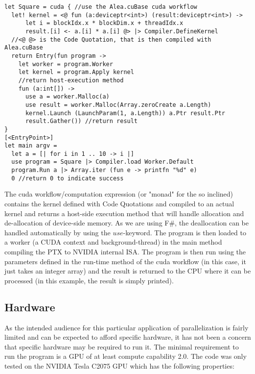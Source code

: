 {\begin{lstlisting}[caption=Alea.cuBase square kernel, label=cubase_add]
let Square = cuda { //use the Alea.cuBase cuda workflow
  let! kernel = <@ fun (a:deviceptr<int>) (result:deviceptr<int>) ->
      let i = blockIdx.x * blockDim.x + threadIdx.x
      result.[i] <- a.[i] * a.[i] @> |> Compiler.DefineKernel
  //<@ @> is the Code Quotation, that is then compiled with Alea.cuBase
  return Entry(fun program ->
    let worker = program.Worker
    let kernel = program.Apply kernel
    //return host-execution method
    fun (a:int[]) ->
      use a = worker.Malloc(a)
      use result = worker.Malloc(Array.zeroCreate a.Length)
      kernel.Launch (LaunchParam(1, a.Length)) a.Ptr result.Ptr
      result.Gather()) //return result
}
[<EntryPoint>]
let main argv = 
  let a = [| for i in 1 .. 10 -> i |]
  use program = Square |> Compiler.load Worker.Default
  program.Run a |> Array.iter (fun e -> printfn "%d" e)
  0 //return 0 to indicate success
\end{lstlisting}

The cuda workflow/computation expression (or "monad" for the so inclined) contains the kernel defined with Code Quotations and compiled to an actual kernel and returns a host-side execution method that will handle allocation and de-allocation of device-side memory. 
As we are using F\#, the deallocation can be handled automatically by using the $use$-keyword. 
The program is then loaded to a worker (a CUDA context and background-thread) in the main method compiling the PTX to NVIDIA internal ISA.
The program is then run using the parameters defined in the run-time method of the cuda workflow (in this case, it just takes an integer array) and the result is returned to the CPU where it can be processed (in this example, the result is simply printed).

\subsection{Hardware}
As the intended audience for this particular application of parallelization is fairly limited and can be expected to afford specific hardware, it has not been a concern that specific hardware may be required to run it.
The minimal requirement to run the program is a GPU of at least compute capability 2.0.
The code was only tested on the NVIDIA Tesla C2075 GPU which has the following properties:

}
